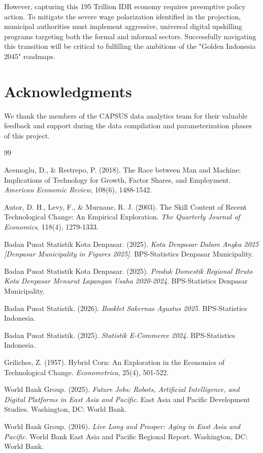 \documentclass[11pt, a4paper, twocolumn]{article}
\newcommand{\acknow}[1]{\section*{Acknowledgments} #1}
\newcommand{\showacknow}{}
\begin{document}
However, capturing this 195 Trillion IDR economy requires preemptive policy action. To mitigate the severe wage polarization identified in the projection, municipal authorities must implement aggressive, universal digital upskilling programs targeting both the formal and informal sectors. Successfully navigating this transition will be critical to fulfilling the ambitions of the "Golden Indonesia 2045" roadmaps.

\acknow{We thank the members of the CAPSUS data analytics team for their valuable feedback and support during the data compilation and parameterization phases of this project.}

\showacknow{}

\begin{thebibliography}{99}
  
Acemoglu, D., \& Restrepo, P. (2018). The Race between Man and Machine: Implications of Technology for Growth, Factor Shares, and Employment. \textit{American Economic Review}, 108(6), 1488-1542.
  
Autor, D. H., Levy, F., \& Murnane, R. J. (2003). The Skill Content of Recent Technological Change: An Empirical Exploration. \textit{The Quarterly Journal of Economics}, 118(4), 1279-1333.
  
Badan Pusat Statistik Kota Denpasar. (2025). \textit{Kota Denpasar Dalam Angka 2025 [Denpasar Municipality in Figures 2025]}. BPS-Statistics Denpasar Municipality.
  
Badan Pusat Statistik Kota Denpasar. (2025). \textit{Produk Domestik Regional Bruto Kota Denpasar Menurut Lapangan Usaha 2020-2024}. BPS-Statistics Denpasar Municipality.
  
Badan Pusat Statistik. (2026). \textit{Booklet Sakernas Agustus 2025}. BPS-Statistics Indonesia.
  
Badan Pusat Statistik. (2025). \textit{Statistik E-Commerce 2024}. BPS-Statistics Indonesia.
  
Griliches, Z. (1957). Hybrid Corn: An Exploration in the Economics of Technological Change. \textit{Econometrica}, 25(4), 501-522.
  
World Bank Group. (2025). \textit{Future Jobs: Robots, Artificial Intelligence, and Digital Platforms in East Asia and Pacific}. East Asia and Pacific Development Studies. Washington, DC: World Bank.
  
World Bank Group. (2016). \textit{Live Long and Prosper: Aging in East Asia and Pacific}. World Bank East Asia and Pacific Regional Report. Washington, DC: World Bank.
  
\end{thebibliography}
\end{document}
